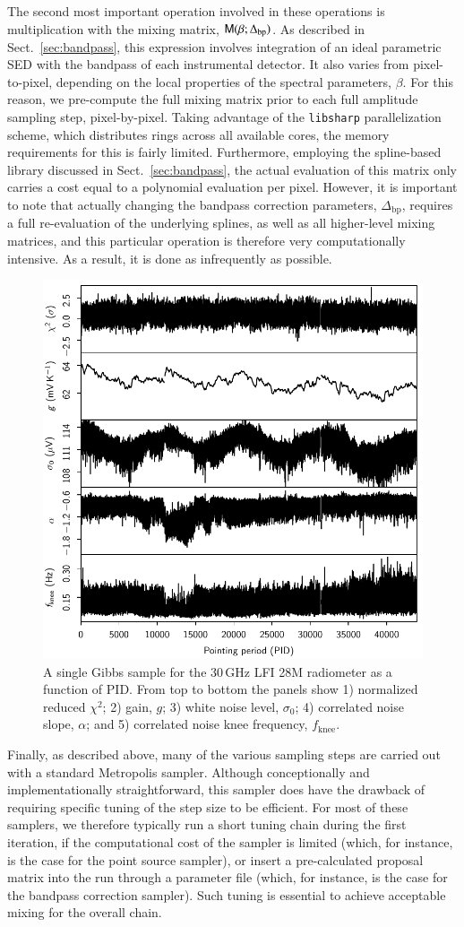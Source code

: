 \documentclass[onecolumn]{aa}
\newcommand{\M}[0]{\tens{M}}
\begin{document}
The second most important operation involved in these operations is
multiplication with the mixing matrix, $\M(\beta;
\Delta_{\mathrm{bp}})$. As described in Sect.~\ref{sec:bandpass}, this
expression involves integration of an ideal parametric SED with the
bandpass of each instrumental detector. It also varies from
pixel-to-pixel, depending on the local properties of the spectral
parameters, $\beta$. For this reason, we pre-compute the full mixing
matrix prior to each full amplitude sampling step,
pixel-by-pixel. Taking advantage of the \texttt{libsharp} parallelization
scheme, which distributes rings across all available cores, the memory
requirements for this is fairly limited. Furthermore, employing the
spline-based library discussed in Sect.~\ref{sec:bandpass}, the actual
evaluation of this matrix only carries a cost equal to a polynomial
evaluation per pixel. However, it is important to note that actually
changing the bandpass correction parameters, $\Delta_{\mathrm{bp}}$, requires
a full re-evaluation of the underlying splines, as well as all
higher-level mixing matrices, and this particular operation is
therefore very computationally intensive. As a result, it is done as
infrequently as possible.

\begin{figure}[t]
  \center
  \includegraphics[width=0.5\linewidth]{figs/pidpar_BP10.pdf}
  \caption{A single Gibbs sample for the 30\,GHz LFI 28M radiometer as a
    function of PID. From top to bottom the panels show 1)
    normalized reduced $\chi^2$; 2) gain, $g$; 3) white noise level,
    $\sigma_0$; 4) correlated noise slope, $\alpha$; and 5) correlated
    noise knee frequency, $f_{\mathrm{knee}}$. }
  \label{fig:pidpar}
\end{figure}


Finally, as described above, many of the various sampling steps are
carried out with a standard Metropolis sampler. Although
conceptionally and implementationally straightforward, this sampler
does have the drawback of requiring specific tuning of the step size
to be efficient. For most of these samplers, we therefore typically
run a short tuning chain during the first iteration, if the
computational cost of the sampler is limited (which, for instance, is
the case for the point source sampler), or insert a pre-calculated
proposal matrix into the run through a parameter file (which, for
instance, is the case for the bandpass correction sampler). Such
tuning is essential to achieve acceptable mixing for the overall
chain.
\end{document}
